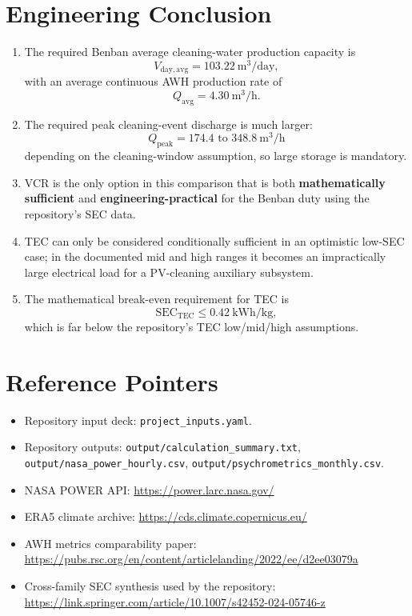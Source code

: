 \documentclass[11pt,a4paper]{article}
\begin{document}
\section{Engineering Conclusion}
\begin{enumerate}[leftmargin=*]
  \item The required Benban average cleaning-water production capacity is
  \begin{equation*}
  V_{\mathrm{day,avg}}=103.22\ \mathrm{m^3/day},
  \end{equation*}
  with an average continuous AWH production rate of
  \begin{equation*}
  Q_{\mathrm{avg}}=4.30\ \mathrm{m^3/h}.
  \end{equation*}
  \item The required peak cleaning-event discharge is much larger:
  \begin{equation*}
  Q_{\mathrm{peak}}=174.4\text{ to }348.8\ \mathrm{m^3/h}
  \end{equation*}
  depending on the cleaning-window assumption, so large storage is mandatory.
  \item VCR is the only option in this comparison that is both \textbf{mathematically sufficient} and \textbf{engineering-practical} for the Benban duty using the repository's SEC data.
  \item TEC can only be considered conditionally sufficient in an optimistic low-SEC case; in the documented mid and high ranges it becomes an impractically large electrical load for a PV-cleaning auxiliary subsystem.
  \item The mathematical break-even requirement for TEC is
  \begin{equation*}
  \mathrm{SEC}_{\mathrm{TEC}} \le 0.42\ \mathrm{kWh/kg},
  \end{equation*}
  which is far below the repository's TEC low/mid/high assumptions.
\end{enumerate}

\section{Reference Pointers}
\begin{itemize}[leftmargin=*]
  \item Repository input deck: \texttt{project\_inputs.yaml}.
  \item Repository outputs: \texttt{output/calculation\_summary.txt}, \texttt{output/nasa\_power\_hourly.csv}, \texttt{output/psychrometrics\_monthly.csv}.
  \item NASA POWER API: \url{https://power.larc.nasa.gov/}
  \item ERA5 climate archive: \url{https://cds.climate.copernicus.eu/}
  \item AWH metrics comparability paper: \url{https://pubs.rsc.org/en/content/articlelanding/2022/ee/d2ee03079a}
  \item Cross-family SEC synthesis used by the repository: \url{https://link.springer.com/article/10.1007/s42452-024-05746-z}
\end{itemize}
\end{document}
